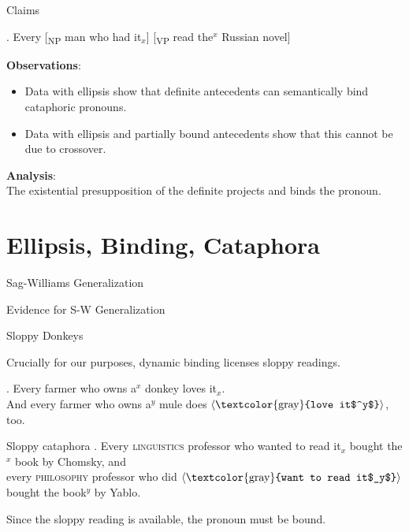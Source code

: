 \documentclass{beamer}
\newcommand{\elide}[1]{\ensuremath{\braket{\text{\textcolor{gray}{#1}}}}}
\begin{document}
\begin{frame}{Claims}

\ex.
  Every [\textsubscript{NP} man who had \alert{it$_x$}] [\textsubscript{VP} read \alert{the$^x$ Russian novel}]

{\bf Observations}:
\begin{itemize}
  \item Data with \alert{ellipsis} show that definite antecedents can semantically bind cataphoric pronouns.
  \item Data with ellipsis and partially bound antecedents show that this cannot be due to crossover.
\end{itemize}

{\bf Analysis}:\\
The existential presupposition of the definite projects and binds the pronoun.

\end{frame}

\section{Ellipsis, Binding, Cataphora}

\begin{frame}{Sag-Williams Generalization}


\end{frame}


\begin{frame}{Evidence for S-W Generalization}


\end{frame}

\begin{frame}{Sloppy Donkeys}

Crucially for our purposes, dynamic binding licenses sloppy readings.

\ex.
  Every farmer who owns a$^x$ donkey loves it$_x$.\\
  And every farmer who owns a$^y$ mule does \elide{love it$^y$}, too.


\end{frame}


\begin{frame}{Sloppy cataphora}
  \ex. Every \textsc{linguistics} professor who wanted to read it$_x$ bought the$^x$ book by Chomsky, and\\
  every \textsc{philosophy} professor who did \elide{want to read it$_y$} bought the book$^y$ by Yablo.

Since the sloppy reading is available, the pronoun must be bound.

\end{frame}
\end{document}
